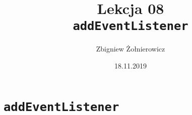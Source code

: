 \documentclass[a4paper]{article}
\begin{document}
\title{{\huge Lekcja 08} \\
    {\Large \texttt{addEventListener}}}
\author{Zbigniew Żołnierowicz}
\date{18.11.2019}
\maketitle
\section{\texttt{addEventListener}}
\end{document}
